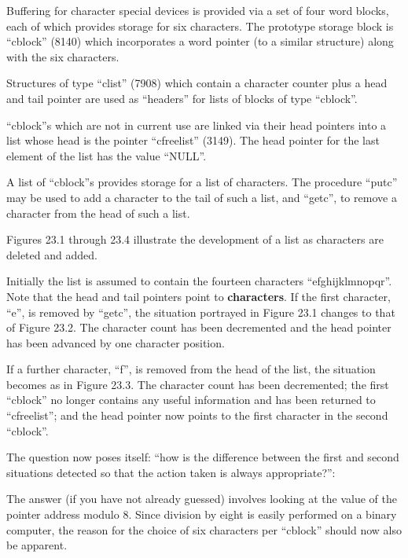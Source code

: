 %
%

Buffering for character special devices
is provided via a set of four word
blocks, each of which provides storage
for six characters. The prototype
storage block is ``cblock'' (8140) which
incorporates a word pointer (to a similar
structure) along with the six characters.

Structures of type ``clist'' (7908) which
contain a character counter plus a head
and tail pointer are used as ``headers''
for lists of blocks of type ``cblock''.

``cblock''s which are not in current use
are linked via their head pointers into
a list whose head is the pointer
``cfreelist'' (3149). The head pointer
for the last element of the list has
the value ``NULL''.

A list of ``cblock''s provides storage
for a list of characters. The procedure
``putc'' may be used to add a character
to the tail of such a list, and ``getc'',
to remove a character from the head of
such a list.

Figures 23.1 through 23.4 illustrate
the development of a list as characters
are deleted and added.





Initially the list is assumed to contain the fourteen characters
``efghijklmnopqr''. Note that the head
and tail pointers point to {\bf characters}.
If the first character, ``e'', is removed
by ``getc'', the situation portrayed in
Figure 23.1 changes to that of Figure
23.2. The character count has been
decremented and the head pointer has
been advanced by one character position.

If a further character, ``f'', is removed
from the head of the list, the
situation becomes as in Figure 23.3.
The character count has been decremented;
the first ``cblock'' no longer
contains any useful information and has
been returned to ``cfreelist''; and the
head pointer now points to the first
character in the second ``cblock''.



The question now poses itself: ``how is
the difference between the first and
second situations detected so that the
action taken is always appropriate?'':

The answer (if you have not already
guessed) involves looking at the value
of the pointer address modulo 8. Since
division by eight is easily performed
on a binary computer, the reason for
the choice of six characters per
``cblock'' should now also be apparent.

